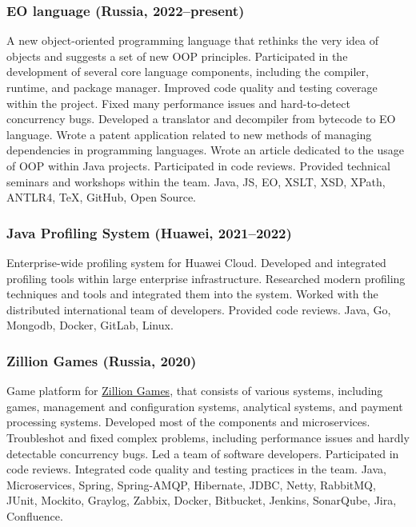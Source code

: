 \documentclass{vl}
\begin{document}
    \subsubsection*{EO language (Russia, 2022--present)}
    A new object-oriented programming language
    that rethinks the very idea of objects and suggests a set of new OOP principles.
    Participated in the development of several core language components,
    including the compiler, runtime, and package manager.
    Improved code quality and testing coverage within the project.
    Fixed many performance issues and hard-to-detect concurrency bugs.
    Developed a translator and decompiler from bytecode to EO language.
    Wrote a patent application related to new methods of managing dependencies in programming languages.
    Wrote an article dedicated to the usage of OOP within Java projects.
    Participated in code reviews.
    Provided technical seminars and workshops within the team.
    Java, JS, EO, XSLT, XSD, XPath, ANTLR4, TeX, GitHub, Open Source.

    \subsubsection*{Java Profiling System (Huawei, 2021--2022)}
    Enterprise-wide profiling system for Huawei Cloud.
    Developed and integrated profiling tools within large enterprise infrastructure.
    Researched modern profiling techniques and tools and integrated them into the system.
    Worked with the distributed international team of developers.
    Provided code reviews.
    Java, Go, Mongodb, Docker, GitLab, Linux.

    \subsubsection*{Zillion Games (Russia, 2020)}
    Game platform for \href{http://zillion.games/}{Zillion Games}, that consists of various systems, including games,
    management and configuration systems, analytical systems, and payment processing systems.
    Developed most of the components and microservices.
    Troubleshot and fixed complex problems, including performance issues and hardly detectable concurrency bugs.
    Led a team of software developers.
    Participated in code reviews.
    Integrated code quality and testing practices in the team.
    Java, Microservices, Spring, Spring-AMQP, Hibernate, JDBC, Netty, RabbitMQ, JUnit, Mockito, Graylog, Zabbix, Docker,
    Bitbucket, Jenkins, SonarQube, Jira, Confluence.
\end{document}
